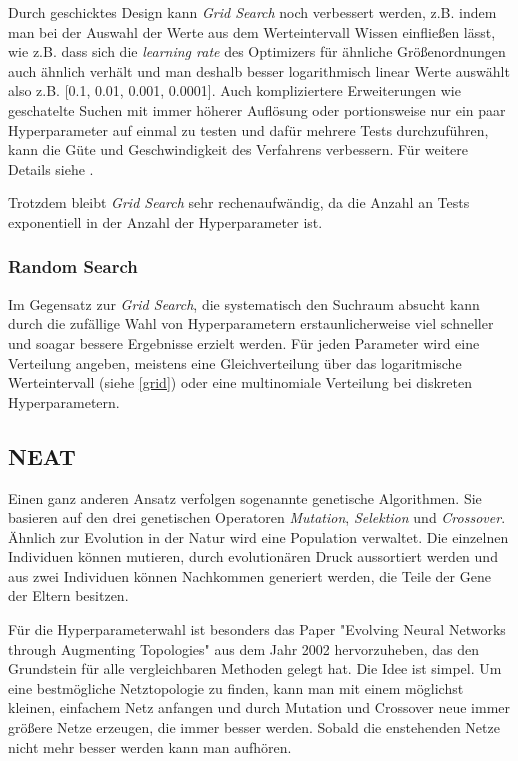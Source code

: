 \documentclass[]{scrartcl}
\begin{document}
			Durch geschicktes Design kann \textit{Grid Search} noch verbessert werden, z.B. indem man bei der Auswahl der Werte aus dem Werteintervall
			Wissen einfließen lässt, wie z.B. dass sich die \textit{learning rate} des Optimizers für ähnliche Größenordnungen auch ähnlich verhält und 
			man deshalb besser logarithmisch linear Werte auswählt also z.B. [0.1, 0.01, 0.001, 0.0001].
			Auch kompliziertere Erweiterungen wie geschatelte Suchen mit immer höherer Auflösung oder portionsweise
			nur ein paar Hyperparameter auf einmal zu testen und dafür mehrere Tests durchzuführen, kann die Güte und Geschwindigkeit des Verfahrens verbessern.
			Für weitere Details siehe \cite{parameters}.

			Trotzdem bleibt \textit{Grid Search} sehr rechenaufwändig, da die Anzahl an Tests exponentiell in der Anzahl der Hyperparameter ist.


		\subsubsection{Random Search}

			Im Gegensatz zur \textit{Grid Search}, die systematisch den Suchraum absucht kann durch die zufällige Wahl von Hyperparametern erstaunlicherweise
			viel schneller und soagar bessere Ergebnisse erzielt werden. \cite{randomsearch}
			Für jeden Parameter wird eine Verteilung angeben, meistens eine Gleichverteilung über das logaritmische Werteintervall (siehe \ref{grid})
			oder eine multinomiale Verteilung bei diskreten Hyperparametern.

		\subsection{NEAT}

			Einen ganz anderen Ansatz verfolgen sogenannte genetische Algorithmen. Sie basieren auf den drei genetischen Operatoren \textit{Mutation}, \textit{Selektion} und \textit{Crossover}.
			Ähnlich zur Evolution in der Natur wird eine Population verwaltet. Die einzelnen Individuen können mutieren, durch evolutionären Druck aussortiert werden und aus zwei
			Individuen können Nachkommen generiert werden, die Teile der Gene der Eltern besitzen.
			
			Für die Hyperparameterwahl ist besonders das Paper "Evolving Neural Networks through Augmenting Topologies" \cite{neat} aus dem Jahr 2002 hervorzuheben, das den Grundstein für alle vergleichbaren Methoden gelegt hat.
			Die Idee ist simpel. Um eine bestmögliche Netztopologie zu finden, kann man mit einem möglichst kleinen, einfachem Netz anfangen und durch Mutation und Crossover
			neue immer größere Netze erzeugen, die immer besser werden. Sobald die enstehenden Netze nicht mehr besser werden kann man aufhören.
\end{document}
